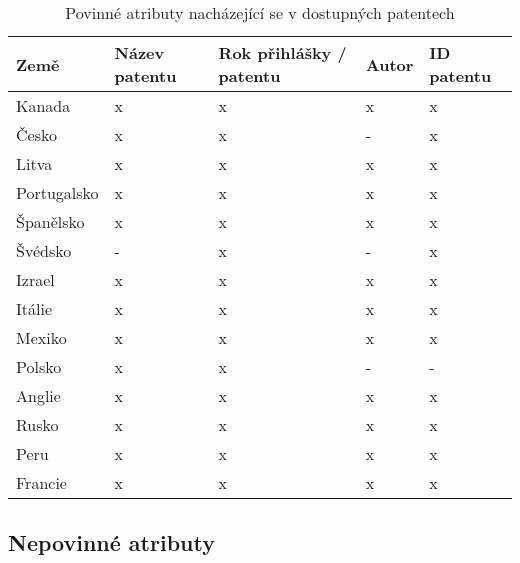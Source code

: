 	\begin{table}[h!]
	\centering
	\begin{tabular}{|>{\centering\arraybackslash}p{2.2cm}|>{\centering\arraybackslash}p{2cm}|>{\centering\arraybackslash}p{3cm}|>{\centering\arraybackslash}p{2cm}|>{\centering\arraybackslash}p{2.5cm}|} 
	\hline
	\textbf{Země}    & \textbf{Název patentu} & \textbf{Rok přihlášky / patentu} & \textbf{Autor} & \textbf{ID patentu}                \\ 
	\hline
	Kanada & x & x & x & x \\
	\hline
	Česko & x & x & - & x \\
	\hline
	Litva & x & x & x & x \\
	\hline
	Portugalsko & x & x & x & x \\
	\hline
	Španělsko & x & x & x & x \\
	\hline
	Švédsko & - & x & - & x \\
	\hline
	Izrael & x & x & x & x \\
	\hline
	Itálie & x & x & x & x \\
	\hline
	Mexiko & x & x & x & x \\
	\hline
	Polsko & x & x & - & - \\
	\hline
	Anglie & x & x & x & x \\
	\hline
	Rusko & x & x & x & x \\
	\hline
	Peru & x & x & x & x \\
	\hline
	Francie & x & x & x & x \\
	\hline
	\end{tabular}
	\caption{Povinné atributy nacházející se v dostupných patentech}
	\label{tab:table_attributes_critical}
	\end{table}

\subsection{Nepovinné atributy}

